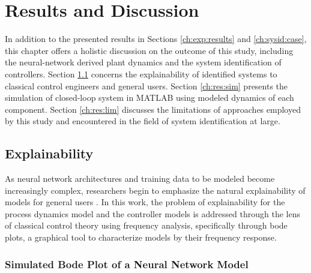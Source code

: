\chapter{Results and Discussion} \label{ch:res}

In addition to the presented results in Sections \ref{ch:exp:results} and \ref{ch:sysid:case}, this chapter offers a holistic discussion on the outcome of this study, including the neural-network derived plant dynamics and the system identification of controllers. Section \ref{ch:res:interp} concerns the explainability of identified systems to classical control engineers and general users. Section \ref{ch:res:sim} presents the simulation of closed-loop system in MATLAB using modeled dynamics of each component. Section \ref{ch:res:lim} discusses the limitations of approaches employed by this study and encountered in the field of system identification at large. 

\section{Explainability} \label{ch:res:interp}

As neural network architectures and training data to be modeled become increasingly complex, researchers begin to emphasize the natural explainability of models for general users \cite{explainability1, explainability2}. In this work, the problem of explainability for the process dynamics model and the controller models is addressed through the lens of classical control theory using frequency analysis, specifically through bode plots, a graphical tool to characterize models by their frequency response. 

\subsection{Simulated Bode Plot of a Neural Network Model}

